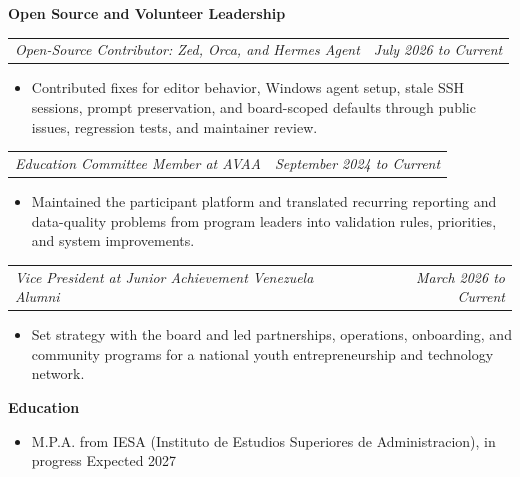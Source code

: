 \documentclass[10pt,letterpaper]{article}
\makeatletter
\newcommand{\bodyfont}{\fontsize{10.5}{15.75}\selectfont}
\newcommand{\sectiontitle}[1]{%
  \vspace{4pt}
  {\bodyfont\textbf{#1}}\par
  \nopagebreak[4]
  \vspace{2pt}
}
\newcommand{\roleline}[2]{%
  \begin{tabularx}{\textwidth}{@{}Xr@{}}
    \bodyfont\textit{#1} & \bodyfont\textit{#2}
  \end{tabularx}
  \nopagebreak[4]
  \vspace{1pt}
}
\makeatother
\begin{document}
\sectiontitle{Open Source and Volunteer Leadership}

\roleline{Open-Source Contributor: Zed, Orca, and Hermes Agent}{July 2026 to Current}
\begin{itemize}
  \item Contributed fixes for editor behavior, Windows agent setup, stale SSH sessions, prompt preservation, and board-scoped defaults through public issues, regression tests, and maintainer review.
\end{itemize}

\vspace{3pt}
\roleline{Education Committee Member at AVAA}{September 2024 to Current}
\begin{itemize}
  \item Maintained the participant platform and translated recurring reporting and data-quality problems from program leaders into validation rules, priorities, and system improvements.
\end{itemize}

\vspace{3pt}
\roleline{Vice President at Junior Achievement Venezuela Alumni}{March 2026 to Current}
\begin{itemize}
  \item Set strategy with the board and led partnerships, operations, onboarding, and community programs for a national youth entrepreneurship and technology network.
\end{itemize}

\sectiontitle{Education}
\begin{itemize}
  \item M.P.A. from IESA (Instituto de Estudios Superiores de Administracion), in progress \hfill Expected 2027
\end{itemize}
\end{document}
